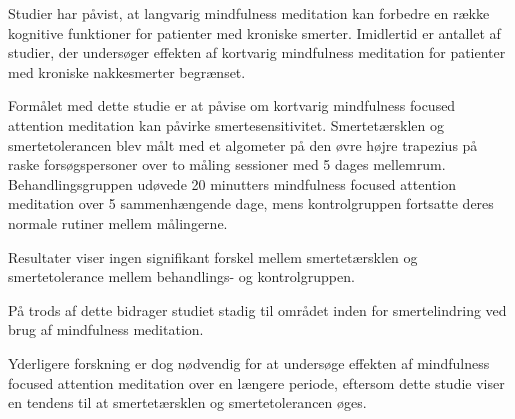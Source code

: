 Studier har påvist, at langvarig mindfulness meditation kan forbedre en række kognitive funktioner for patienter med kroniske smerter. 
Imidlertid er antallet af studier, der undersøger effekten af kortvarig mindfulness meditation for patienter med kroniske nakkesmerter begrænset. 

Formålet med dette studie er at påvise om kortvarig mindfulness focused attention meditation kan påvirke smertesensitivitet. Smertetærsklen og smertetolerancen blev målt med et algometer på den øvre højre trapezius på raske forsøgspersoner over to måling sessioner med 5 dages mellemrum. 
Behandlingsgruppen udøvede 20 minutters mindfulness focused attention meditation over 5 sammenhængende dage, mens kontrolgruppen fortsatte deres normale rutiner mellem målingerne.

Resultater viser ingen signifikant forskel mellem smertetærsklen og smertetolerance mellem behandlings- og kontrolgruppen. 

På trods af dette bidrager studiet stadig til området inden for smertelindring ved brug af mindfulness meditation. 

Yderligere forskning er dog nødvendig for at undersøge effekten af mindfulness focused attention meditation over en længere periode, eftersom dette studie viser en tendens til at smertetærsklen og smertetolerancen øges.
